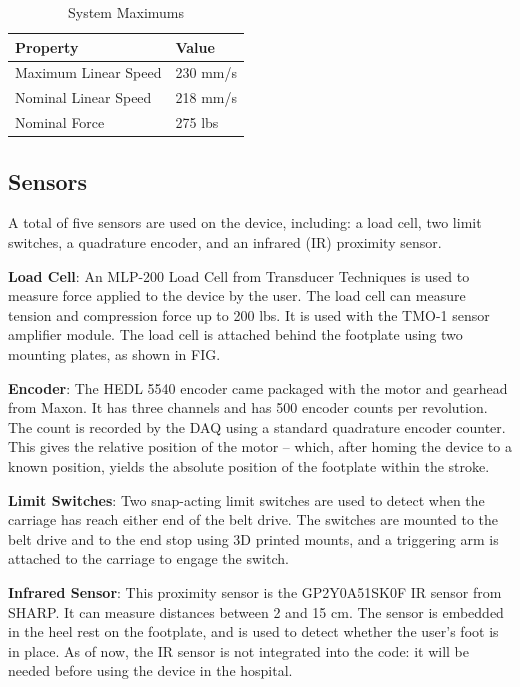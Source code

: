 \documentclass[12pt]{report}
\begin{document}
	\begin{table}[h]
	\centering
	\caption{System Maximums}	
	\begin{tabular}{|l|l|}
		\hline
		\textbf{Property} & \textbf{Value}  \\ \hline
 		Maximum Linear Speed & 230 mm/s \\ \hline
 		Nominal Linear Speed & 218 mm/s \\ \hline
 		Nominal Force & 275 lbs \\ \hline
		\end{tabular}
	\label{tab:gear}
	\end{table}		
		
		
		\subsection{Sensors}

	A total of five sensors are used on the device, including: a load cell, two limit switches, a quadrature encoder, and an infrared (IR) proximity sensor. 
	
	\textbf{Load Cell}: An MLP-200 Load Cell from Transducer Techniques is used to measure force applied to the device by the user. The load cell can measure tension and compression force up to 200 lbs. It is used with the TMO-1 sensor amplifier module. The load cell is attached behind the footplate using two mounting plates, as shown in FIG. 
	
	\textbf{Encoder}: The HEDL 5540 encoder came packaged with the motor and gearhead from Maxon. It has three channels and has 500 encoder counts per revolution. The count is recorded by the DAQ using a standard quadrature encoder counter. This gives the relative position of the motor -- which, after homing the device to a known position, yields the absolute position of the footplate within the stroke. 
	
	\textbf{Limit Switches}: Two snap-acting limit switches are used to detect when the carriage has reach either end of the belt drive. The switches are mounted to the belt drive and to the end stop using 3D printed mounts, and a triggering arm is attached to the carriage to engage the switch. 
	
	\textbf{Infrared Sensor}: This proximity sensor is the GP2Y0A51SK0F IR sensor from SHARP. It can measure distances between 2 and 15 cm. The sensor is embedded in the heel rest on the footplate, and is used to detect whether the user's foot is in place. As of now, the IR sensor is not integrated into the code: it will be needed before using the device in the hospital.
	
\end{document}
